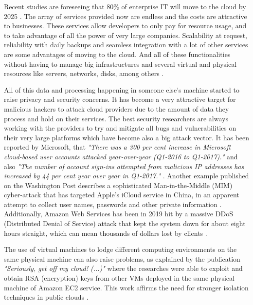 Recent studies are foreseeing that 80{\%} of enterprise IT will move to the cloud by 2025 \cite{cloud_statistic:1}. The array of services provided now are endless and the costs are attractive to businesses. These services allow developers to only pay for resource usage, and to take advantage of all the power of very large companies. Scalability at request, reliability with daily backups and seamless integration with a lot of other services are some advantages of moving to the cloud. And all of these functionalities without having to manage big infrastructures and several virtual and physical resources like servers, networks, disks, among others \cite{cloud_benefits:1}.

All of this data and processing happening in someone else's machine started to raise privacy and security concerns. It has become a very attractive target for malicious hackers to attack cloud providers due to the amount of data they process and hold on their services. The best security researchers are always working with the providers to try and mitigate all bugs and vulnerabilities on their very large platforms which have become also a big attack vector. It has been reported by Microsoft, that \textit{"There was a 300 per cent increase in Microsoft cloud-based user accounts attacked year-over-year (Q1-2016 to Q1-2017)."} and also \textit{"The number of account sign-ins attempted from malicious IP addresses has increased by 44 per cent year over year in Q1-2017."} \cite{cloud_attacks:1}. Another example published on the Washington Post describes a sophisticated Man-in-the-Middle (\gls{MIM}) cyber-attack that has targeted Apple’s iCloud service in China, in an apparent attempt to collect user names, passwords and other private information \cite{cloud_attacks:2}. Additionally, Amazon Web Services has been in 2019 hit by a massive \gls{DDoS} (Distributed Denial of Service) attack that kept the system down for about eight hours straight, which can mean thousands of dollars lost by clients \cite{cloud_attacks:3}.

The use of virtual machines to lodge different computing environments on the same physical machine can also raise problems, as explained by the publication \textit{"Seriously, get off my cloud! (...)"} where the researches were able to exploit and obtain \gls{RSA} (encryption) keys from other \glspl{VM} deployed in the same physical machine of Amazon EC2 service. This work affirms the need for stronger isolation techniques in public clouds \cite{cryptoeprint:2015:898}.

